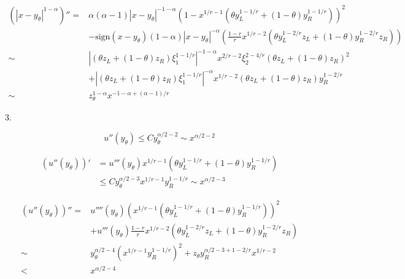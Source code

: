 \documentclass{ctexart}
\begin{document}
\begin{equation}
    \begin{aligned}
        (|x-y_\theta|^{1-\alpha})''
        =    & \alpha(\alpha-1)|x-y_\theta|^{-1-\alpha} (1-x^{1/r-1}(\theta y_L^{1-1/r} + (1-\theta)y_R^{1-1/r}))^2                                     \\
             & - \text{sign}(x-y_\theta)(1-\alpha)|x-y_\theta|^{-\alpha}(\frac{1-r}{r} x^{1/r-2} (\theta y_L^{1-2/r} z_L + (1-\theta) y_R^{1-2/r} z_R)) \\
        \sim & | (\theta z_L + (1-\theta) z_R) \xi_1^{1-1/r} |^{-1-\alpha} x^{2/r-2} \xi_2^{2-4/r} (\theta z_L + (1-\theta) z_R)^2                      \\
             & + | (\theta z_L + (1-\theta) z_R) \xi_1^{1-1/r} |^{-\alpha} x^{1/r-2} (\theta z_L + (1-\theta) z_R)y_R^{1-2/r}                           \\
        \sim & z_\theta^{1-\alpha} x^{-1-\alpha + (\alpha-1)/r}
    \end{aligned}
\end{equation}


3.

\begin{equation}
    u''(y_\theta) \le C y_\theta^{\alpha/2-2} \sim x^{\alpha/2-2}
\end{equation}


\begin{equation}
    \begin{aligned}
        (u''(y_\theta))' & = u'''(y_\theta) x^{1/r-1}(\theta y_L^{1-1/r} + (1-\theta) y_R^{1-1/r}) \\
                         & \le C y_\theta^{\alpha/2-3}x^{1/r-1} y_R^{1-1/r} \sim x^{\alpha/2-3}
    \end{aligned}
\end{equation}

\begin{equation}
    \begin{aligned}
        (u''(y_\theta))'' = & u''''(y_\theta) (x^{1/r-1}(\theta y_L^{1-1/r} + (1-\theta) y_R^{1-1/r}))^2                  \\
                            & + u'''(y_\theta)\frac{1-r}{r} x^{1/r-2}(\theta y_L^{1-2/r}z_L + (1-\theta) y_R^{1-2/r}z_R)  \\
        \sim                & y_\theta^{\alpha/2-4} (x^{1/r-1} y_R^{1-1/r})^2 + z_\theta y_R^{\alpha/2-3 +1-2/r}x^{1/r-2} \\
        <                   & x^{\alpha/2-4}
    \end{aligned}
\end{equation}
\end{document}
